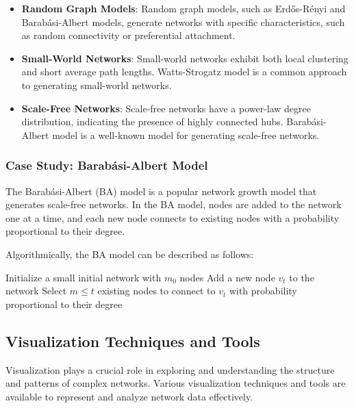 \documentclass[12pt]{book} %
\begin{document}
\begin{itemize}
    \item \textbf{Random Graph Models}: Random graph models, such as Erdős-Rényi and Barabási-Albert models, generate networks with specific characteristics, such as random connectivity or preferential attachment.
    
    \item \textbf{Small-World Networks}: Small-world networks exhibit both local clustering and short average path lengths. Watts-Strogatz model is a common approach to generating small-world networks.
    
    \item \textbf{Scale-Free Networks}: Scale-free networks have a power-law degree distribution, indicating the presence of highly connected hubs. Barabási-Albert model is a well-known model for generating scale-free networks.
\end{itemize}

\subsubsection{Case Study: Barabási-Albert Model}

The Barabási-Albert (BA) model is a popular network growth model that generates scale-free networks. In the BA model, nodes are added to the network one at a time, and each new node connects to existing nodes with a probability proportional to their degree.

Algorithmically, the BA model can be described as follows:
\FloatBarrier
\begin{algorithm}
\caption{Barabási-Albert Model}\label{alg:ba-model}
\begin{algorithmic}[1]
\State Initialize a small initial network with \(m_0\) nodes
    \State Add a new node \(v_t\) to the network
    \State Select \(m \leq t\) existing nodes to connect to \(v_t\) with probability proportional to their degree
\EndFor
\end{algorithmic}
\end{algorithm}
\FloatBarrier

\subsection{Visualization Techniques and Tools}

Visualization plays a crucial role in exploring and understanding the structure and patterns of complex networks. Various visualization techniques and tools are available to represent and analyze network data effectively.
\end{document}
